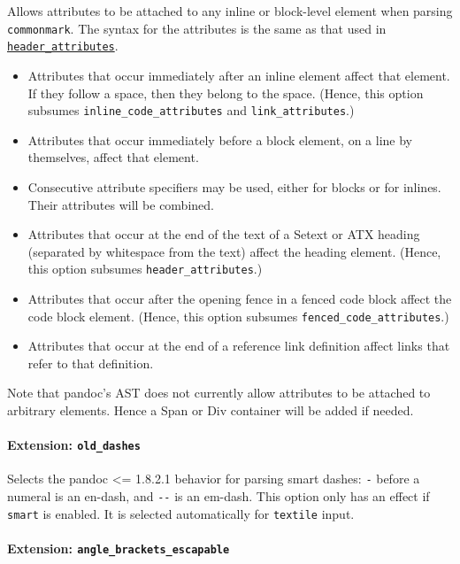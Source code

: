 \documentclass[
  a4paper,
]{article}
\providecommand{\tightlist}{%
  \setlength{\itemsep}{0pt}\setlength{\parskip}{0pt}}
\begin{document}
Allows attributes to be attached to any inline or block-level element
when parsing \texttt{commonmark}. The syntax for the attributes is the
same as that used in
\protect\hyperlink{extension-header_attributes}{\texttt{header\_attributes}}.

\begin{itemize}
\tightlist
\item
  Attributes that occur immediately after an inline element affect that
  element. If they follow a space, then they belong to the space.
  (Hence, this option subsumes \texttt{inline\_code\_attributes} and
  \texttt{link\_attributes}.)
\item
  Attributes that occur immediately before a block element, on a line by
  themselves, affect that element.
\item
  Consecutive attribute specifiers may be used, either for blocks or for
  inlines. Their attributes will be combined.
\item
  Attributes that occur at the end of the text of a Setext or ATX
  heading (separated by whitespace from the text) affect the heading
  element. (Hence, this option subsumes \texttt{header\_attributes}.)
\item
  Attributes that occur after the opening fence in a fenced code block
  affect the code block element. (Hence, this option subsumes
  \texttt{fenced\_code\_attributes}.)
\item
  Attributes that occur at the end of a reference link definition affect
  links that refer to that definition.
\end{itemize}

Note that pandoc's AST does not currently allow attributes to be
attached to arbitrary elements. Hence a Span or Div container will be
added if needed.

\hypertarget{extension-old_dashes}{%
\paragraph{\texorpdfstring{Extension:
\texttt{old\_dashes}}{Extension: old\_dashes}}\label{extension-old_dashes}}

Selects the pandoc \textless= 1.8.2.1 behavior for parsing smart dashes:
\texttt{-} before a numeral is an en-dash, and \texttt{-\/-} is an
em-dash. This option only has an effect if \texttt{smart} is enabled. It
is selected automatically for \texttt{textile} input.

\hypertarget{extension-angle_brackets_escapable}{%
\paragraph{\texorpdfstring{Extension:
\texttt{angle\_brackets\_escapable}}{Extension: angle\_brackets\_escapable}}\label{extension-angle_brackets_escapable}}
\end{document}
